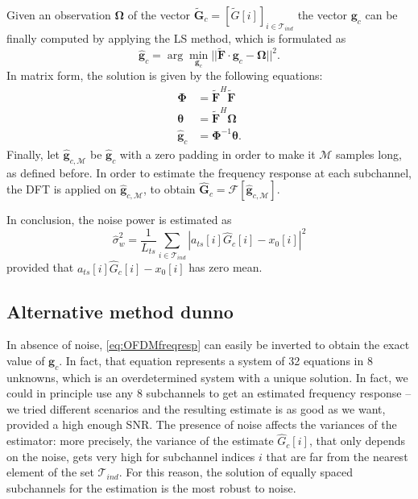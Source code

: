 \documentclass[10pt]{article}
\newcommand{\ofdM} {\mathcal{M}}
\newcommand{\DFTreduced} {\mathbf{\tilde{F}}}
\begin{document}
Given an observation $\boldsymbol{\Omega}$ of the vector $\tilde{\mathbf{G}}_c = [ \tilde{G}[i] ]_{i\in \mathcal{T}_{ind}}$ the vector $\mathbf{g}_{c}$ can be finally computed by applying the LS method, which is formulated as
\begin{equation}
	\mathbf{\hat{g}}_c = \arg\min_{\mathbf{g}_c} ||\DFTreduced \cdot \mathbf{g}_{c} - \boldsymbol{\Omega}||^2.
\end{equation}
In matrix form, the solution is given by the following equations:
\begin{align}
	\boldsymbol{\Phi} &= \DFTreduced^H \DFTreduced \\
	\boldsymbol{\theta} &= \DFTreduced^H \boldsymbol{\Omega} \\ 
	\hat{\mathbf{g}}_{c} &= \boldsymbol{\Phi}^{-1} \boldsymbol{\theta}.
\end{align}
Finally, let $\hat{\mathbf{g}}_{c, \ofdM}$ be $\hat{\mathbf{g}}_{c}$ with a zero padding in order to make it $\ofdM$ samples long, as defined before. In order to estimate the frequency response at each subchannel, the DFT is applied on $\hat{\mathbf{g}}_{c, \ofdM}$, to obtain $\mathbf{\hat{G}}_c = \mathcal{F}[\mathbf{\hat{g}}_{c, \ofdM}]$. 

In conclusion, the noise power is estimated as 
\begin{equation}
	\hat{\sigma}_w^2 = \frac{1}{L_{ts}} \sum_{i \in \mathcal{T}_{ind}} |a_{ts}[i]\hat{G}_c[i] - x_0[i]|^2
\end{equation}
provided that $a_{ts}[i]\hat{G}_c[i] - x_0[i]$ has zero mean.


\subsection*{Alternative method dunno}

In absence of noise, \eqref{eq:OFDMfreqresp} can easily be inverted to obtain the exact value of $\mathbf{g}_c$. In fact, that equation represents a system of 32 equations in 8 unknowns, which is an overdetermined system with a unique solution. In fact, we could in principle use any 8 subchannels to get an estimated frequency response -- we tried different scenarios and the resulting estimate is as good as we want, provided a high enough SNR. The presence of noise affects the variances of the estimator: more precisely, the variance of the estimate $\hat{G}_c[i]$, that only depends on the noise, gets very high for subchannel indices $i$ that are far from the nearest element of the set $\mathcal{T}_{ind}$. For this reason, the solution of equally spaced subchannels for the estimation is the most robust to noise.
\end{document}
